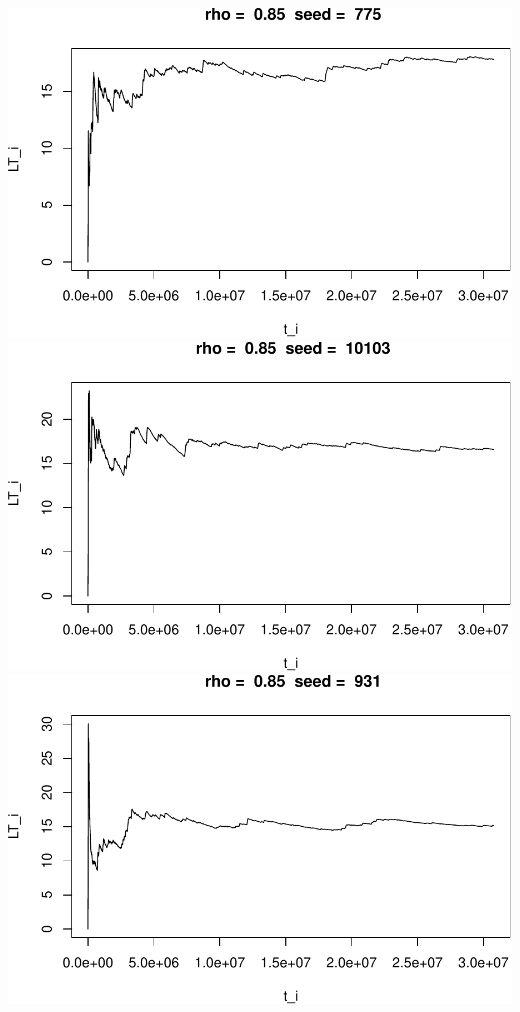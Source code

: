 \documentclass[]{article}
\begin{document}
\includegraphics{003_files/figure-latex/unnamed-chunk-20-1.pdf}
\includegraphics{003_files/figure-latex/unnamed-chunk-20-2.pdf}
\includegraphics{003_files/figure-latex/unnamed-chunk-20-3.pdf}
\end{document}
